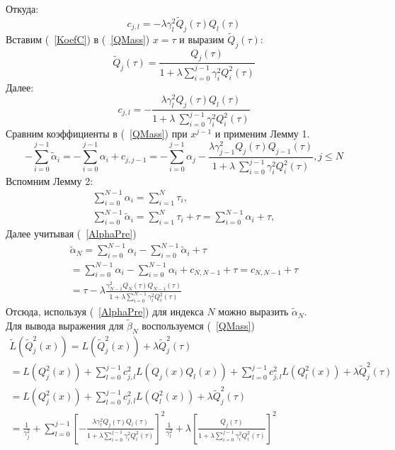 Откуда:
\begin{equation}
\label{KoefC}
c_{j,l}=-\lambda\gamma_{l}^2 \tilde{Q}_j(\tau)Q_l(\tau)
\end{equation}
Вставим (~\ref{KoefC}) в (~\ref{QMass}) $x=\tau$ и выразим $\tilde{Q}_j(\tau)$:
\begin{equation}
\label{Eq15}
\tilde{Q}_j(\tau)=\frac{Q_j(\tau)}
{1+\lambda\sum\limits_{i=0}^{j-1}{\gamma_i^2 Q_i^2(\tau) }}
\end{equation}
Далее:
\begin{equation}
\label{Eq16}
c_{j,l}=-\frac
{\lambda \gamma_l^2 Q_j(\tau) Q_l(\tau)}
{1+\lambda\ \sum\limits_{i=0}^{j-1} {\gamma_i^2 Q_i^2(\tau)}}
\end{equation}
Сравним коэффициенты в (~\ref{QMass}) при $x^{j-1}$ и применим Лемму 1.
\begin{equation}
\label{AlphaPre}
-\sum\limits_{i=0}^{j-1}{\tilde{\alpha}_i}=-\sum\limits_{i=0}^{j-1}{\alpha_i}
+c_{j,j-1}=-\sum\limits_{i=0}^{j-1}{\alpha_j}-\frac
{\lambda \gamma_{j-1}^2 Q_j(\tau) Q_{j-1}(\tau)}
{1+\lambda\ \sum\limits_{i=0}^{j-1} {\gamma_i^2 Q_i^2(\tau)}},j\leq N
\end{equation}
Вспомним Лемму 2:
\begin{eqnarray}
\sum\limits_{i=0}^{N-1}{\alpha_i}=\sum_{i=1}^{N}{\tau_i},  \nonumber \\
\sum\limits_{i=0}^{N-1}{\tilde{\alpha}_i}=\sum_{i=1}^{N}{\tau_i}+\tau=\sum\limits_{i=0}^{N-1}{\alpha_i}+\tau, \nonumber
\end{eqnarray}
Далее учитывая (~\ref{AlphaPre})
\begin{eqnarray}
\tilde{\alpha}_N=\sum\limits_{i=0}^{N-1}{\alpha_i}-\sum\limits_{i=0}^{N-1}{\tilde{\alpha}_i}+\tau \nonumber \\
=\sum\limits_{i=0}^{N-1}{\alpha_i}-\sum\limits_{i=0}^{N-1}{\alpha_i}+c_{N,N-1}+\tau=c_{N,N-1}+\tau \nonumber \\
=\tau-\lambda
\frac {\gamma_{N-1}^2 Q_N(\tau) Q_{N-1}(\tau)}
{1+\lambda\sum\limits_{i=0}^{N-1}{\gamma_i^2 Q_i^2(\tau)}}
\end{eqnarray}
Отсюда, используя (~\ref{AlphaPre}) для индекса $N$ можно выразить $\tilde{\alpha}_N$. \\
Для вывода выражения для $\tilde{\beta}_N$ воспользуемся (~\ref{QMass})
\begin{eqnarray}
\tilde{L}(\tilde{Q}_j^2(x))= L(\tilde{Q}_j^2(x))+\lambda\tilde{Q}_j^2(\tau) \nonumber \\
=L(Q_j^2(x))+\sum\limits_{l=0}^{j-1}{c_{j,l}^2 L(Q_j(x)Q_l(x))}+\sum\limits_{l=0}^{j-1}{c_{j,l}^2L(Q_l^2(x))}+\lambda\tilde{Q}_j^2(\tau) \nonumber \\
=L(Q_j^2(x))+\sum\limits_{l=0}^{j-1}{c_{j,l}^2L(Q_l^2(x))}+\lambda\tilde{Q}_j^2(\tau) \nonumber \\
=\frac{1}{\gamma_j^2}+\sum\limits_{l=0}^{j-1}
{\left[
-\frac {\lambda \gamma_l^2 Q_j(\tau)Q_l(\tau)}
{1+\lambda \sum\limits_{i=0}^{j-1}{\gamma_i^2 Q_i^2(\tau)}}
\right]^2\frac{1}{\gamma_l^2}}+
\lambda
\left[
\frac{Q_j(\tau)}
{1+\lambda \sum\limits_{i=0}^{j-1}{\gamma_i^2 Q_i^2(\tau)}}
\right]^2 \nonumber
\end{eqnarray}

